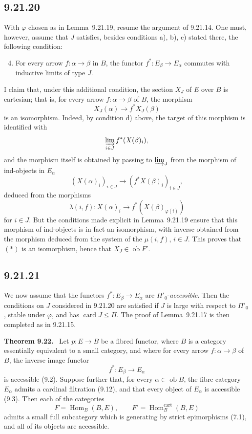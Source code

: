 \documentclass[11pt]{article}
\newcommand{\ob}{\operatorname{ob}}
\newcommand{\card}{\operatorname{card}}
\newcommand{\Hhom}{\operatorname{Hom}}
\newcommand{\Hhomcart}{\operatorname{Hom}^{\mathrm{cart}}}
\newenvironment{statement}[1]{\par\medskip\noindent\textbf{#1.}\ }{\par\medskip}
\begin{document}
\subsection*{9.21.20}

With $\varphi$ chosen as in Lemma~9.21.19, resume the argument of 9.21.14. One must, however, assume that $J$ satisfies, besides conditions a), b), c) stated there, the following condition:
\begin{enumerate}[label=\alph*)]
\setcounter{enumi}{3}
\item For every arrow $f:\alpha\to\beta$ in $B$, the functor $f^\ast:E_\beta\to E_\alpha$ commutes with inductive limits of type $J$.
\end{enumerate}

I claim that, under this additional condition, the section $X_J$ of $E$ over $B$ is cartesian; that is, for every arrow $f:\alpha\to\beta$ of $B$, the morphism
\begin{equation}
 X_J(\alpha)\longrightarrow f^\ast X_J(\beta)
 \tag{$\ast$}
\end{equation}
is an isomorphism. Indeed, by condition d) above, the target of this morphism is identified with
\[
 \varinjlim_{i\in J}f^\ast(X(\beta)_i),
\]
and the morphism itself is obtained by passing to $\varinjlim_J$ from the morphism of ind-objects in $E_\alpha$
\[
 (X(\alpha)_i)_{i\in J}\longrightarrow (f^\ast X(\beta)_i)_{i\in J},
\]
deduced from the morphisms
\[
 \lambda(i,f):X(\alpha)_i\longrightarrow f^\ast(X(\beta)_{\varphi(i)})
\]
for $i\in J$. But the conditions made explicit in Lemma~9.21.19 ensure that this morphism of ind-objects is in fact an isomorphism, with inverse obtained from the morphism deduced from the system of the $\mu(i,f)$, $i\in J$. This proves that $(\ast)$ is an isomorphism, hence that $X_J\in\ob F'$.

\subsection*{9.21.21}

We now assume that the functors $f^\ast:E_\beta\to E_\alpha$ are $\Pi'_0$-\emph{accessible}. Then the conditions on $J$ considered in 9.21.20 are satisfied if $J$ is large with respect to $\Pi'_0$, stable under $\varphi$, and has $\card J\leq\Pi$. The proof of Lemma~9.21.17 is then completed as in 9.21.15.

\begin{statement}{Theorem 9.22}
Let $p:E\to B$ be a fibred functor, where $B$ is a category essentially equivalent to a small category, and where for every arrow $f:\alpha\to\beta$ of $B$, the inverse image functor
\[
 f^\ast:E_\beta\longrightarrow E_\alpha
\]
is accessible (9.2). Suppose further that, for every $\alpha\in\ob B$, the fibre category $E_\alpha$ admits a cardinal filtration (9.12), and that every object of $E_\alpha$ is accessible (9.3). Then each of the categories
\[
 F=\Hhom_B(B,E),\qquad F'=\Hhomcart_B(B,E)
\]
admits a small full subcategory which is generating by strict epimorphisms (7.1), and all of its objects are accessible.
\end{statement}
\end{document}
